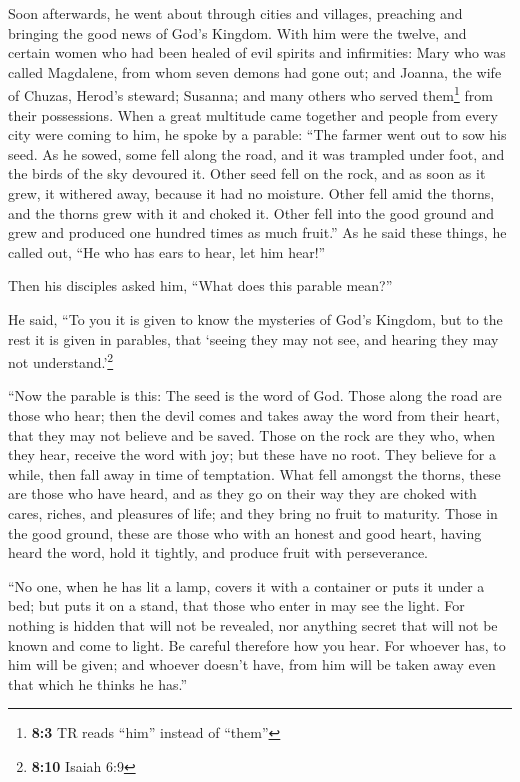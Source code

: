  Soon afterwards, he went about through cities and
villages, preaching and bringing the good news of God's Kingdom. With
him were the twelve,  and certain women who had been
healed of evil spirits and infirmities: Mary who was called Magdalene,
from whom seven demons had gone out;  and Joanna, the wife
of Chuzas, Herod's steward; Susanna; and many others who served
them\footnote{\textbf{8:3} TR reads ``him'' instead of ``them''} from
their possessions.  When a great multitude came together
and people from every city were coming to him, he spoke by a parable:
 ``The farmer went out to sow his seed. As he sowed, some
fell along the road, and it was trampled under foot, and the birds of
the sky devoured it.  Other seed fell on the rock, and as
soon as it grew, it withered away, because it had no moisture.
 Other fell amid the thorns, and the thorns grew with it
and choked it.  Other fell into the good ground and grew
and produced one hundred times as much fruit.'' As he said these things,
he called out, ``He who has ears to hear, let him hear!''

 Then his disciples asked him, ``What does this parable
mean?''

 He said, ``To you it is given to know the mysteries of
God's Kingdom, but to the rest it is given in parables, that `seeing
they may not see, and hearing they may not understand.'\footnote{\textbf{8:10}
  Isaiah 6:9}

 ``Now the parable is this: The seed is the word of God.
 Those along the road are those who hear; then the devil
comes and takes away the word from their heart, that they may not
believe and be saved.  Those on the rock are they who,
when they hear, receive the word with joy; but these have no root. They
believe for a while, then fall away in time of temptation.
 What fell amongst the thorns, these are those who have
heard, and as they go on their way they are choked with cares, riches,
and pleasures of life; and they bring no fruit to maturity.
 Those in the good ground, these are those who with an
honest and good heart, having heard the word, hold it tightly, and
produce fruit with perseverance.

 ``No one, when he has lit a lamp, covers it with a
container or puts it under a bed; but puts it on a stand, that those who
enter in may see the light.  For nothing is hidden that
will not be revealed, nor anything secret that will not be known and
come to light.  Be careful therefore how you hear. For
whoever has, to him will be given; and whoever doesn't have, from him
will be taken away even that which he thinks he has.''

